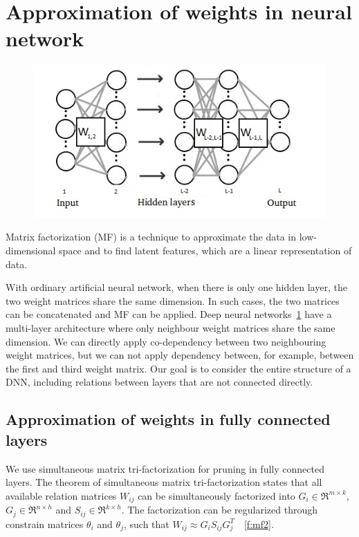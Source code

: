 \documentclass{article} %
\begin{document}

\section{Approximation of weights in neural network}
\begin{figure}[!ht]
\centering
\includegraphics[width=.65\linewidth]{DNN2.jpg}
\label{f:dnn}
\end{figure}

Matrix factorization (MF) is a technique to  approximate the data in low-dimensional space
and to find latent features, which are a linear representation of data.

With ordinary artificial neural network, when there is only one hidden layer, the two 
weight matrices share the same dimension. In such cases, the two matrices can be 
concatenated and MF can be applied. Deep neural networks~\ref{f:dnn} have a multi-layer 
architecture where only neighbour weight matrices share the same dimension. We can 
directly apply co-dependency between two neighbouring weight matrices, but we can not 
apply dependency between, for example, between the first and third weight matrix. Our goal
is to consider the entire structure of a DNN, including relations between layers that are 
not connected directly.


\subsection{Approximation of weights in fully connected layers}

We use simultaneous matrix tri-factorization for pruning in fully connected layers. The 
theorem of simultaneous matrix tri-factorization states that all available relation 
matrices $W_{ij}$ can be simultaneously factorized into $G_i \in \Re^{m \times 
k}$, $G_j \in \Re^{n \times h}$ and $S_{ij} \in \Re^{k \times h}$. The factorization can 
be regularized through constrain matrices $\theta_i$ and $\theta_j$, such that $W_{ij} 
\approx G_iS_{ij}G_j^T$~\cite{zitnik2015data}~\ref{f:mf2}.
\end{document}
